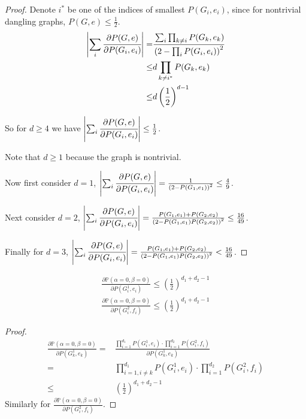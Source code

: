 	\begin{proof}
		Denote $i^*$ be one of the indices of smallest $P(G_i, e_i)$, since for nontrivial dangling graphs, $P(G,e) \leq \frac{1}{2}$.
	\begin{align*}
		\left\vert\sum_i \cfrac{\partial P(G,e)}{\partial P(G_i,e_i)}\right\vert  =& \cfrac{\sum_i \prod_{k \neq i} P(G_k, e_k)  }{\left( 2 - \prod_i P(G_i, e_i) \right)^2} \\
		\leq & d \prod_{k \neq i^*} P(G_k, e_k) \\
		\leq & d \left( \frac{1}{2} \right)^{d-1}
	\end{align*}

	So for $d \geq 4$ we have $\left\vert\sum_i \cfrac{\partial P(G,e)}{\partial P(G_i,e_i)}\right\vert \leq \frac{1}{2}$.

	Note that $d\geq 1$ because the graph is nontrivial.

	Now first consider $d=1$, $\left\vert\sum_i \cfrac{\partial P(G,e)}{\partial P(G_i,e_i)}\right\vert = \frac{1}{\left( 2 - P(G_1,e_1) \right)^2} \leq \frac{4}{9} $.

	Next consider $d=2$,  $\left\vert\sum_i \cfrac{\partial P(G,e)}{\partial P(G_i,e_i)}\right\vert = \frac{P(G_1,e_1) + P(G_2,e_2)}{\left( 2 - P(G_1,e_1)P(G_2,e_2) \right)^2} \leq \frac{16}{49} $.

	Finally for $d=3$,  $\left\vert\sum_i \cfrac{\partial P(G,e)}{\partial P(G_i,e_i)}\right\vert = \frac{P(G_1,e_1) + P(G_2,e_2)}{\left( 2 - P(G_1,e_1)P(G_2,e_2) \right)^2} < \frac{16}{49} $.
	\end{proof}



	\begin{Prop}
		\begin{align*}
			\frac{\partial \mathbb{P}\left( \alpha = 0, \beta = 0 \right) }{ \partial P(G_i^1, e_i) } \leq (\frac{1}{2})^{d_1 + d_2 -1} \\
			\frac{\partial \mathbb{P}\left( \alpha = 0, \beta = 0 \right) }{ \partial P(G_i^2, f_i) } \leq (\frac{1}{2})^{d_1 + d_2 -1} 
		\end{align*}
	\end{Prop}
	\begin{proof}
		\begin{align*}
			\frac{\partial \mathbb{P}\left( \alpha = 0, \beta = 0 \right) }{ \partial P(G_k^1, e_k) } = &\frac{\prod_{i=1}^{d_1} P(G_i^1, e_i) \cdot \prod_{i=1}^{d_2} P(G_i^2, f_i) }{\partial P(G_k^1, e_k)} \\
			=&\prod_{i=1,i\neq k}^{d_1} P(G_i^1, e_i) \cdot \prod_{i=1}^{d_2} P(G_i^2, f_i)\\
			\leq & (\frac{1}{2})^{d_1 + d_2 -1}
		\end{align*}
		Similarly for $\frac{\partial \mathbb{P}\left( \alpha = 0, \beta = 0 \right) }{ \partial P(G_i^2, f_i) }$.
	\end{proof}

